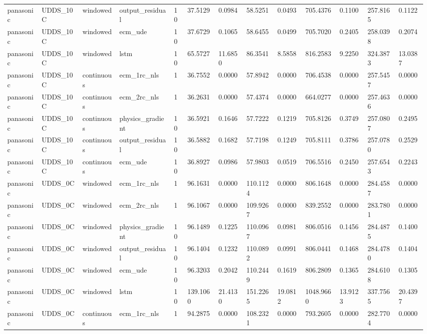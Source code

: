 \begin{tabular}{lllllllllllll}
panasonic & UDDS\_10C & windowed & output\_residual & 10 & 37.5129 & 0.0984 & 58.5251 & 0.0493 & 705.4376 & 0.1100 & 257.8165 & 0.1122 \\
panasonic & UDDS\_10C & windowed & ecm\_ude & 10 & 37.6729 & 0.1065 & 58.6455 & 0.0499 & 705.7020 & 0.2405 & 258.0398 & 0.2074 \\
panasonic & UDDS\_10C & windowed & lstm & 10 & 65.5727 & 11.6850 & 86.3541 & 8.5858 & 816.2583 & 9.2250 & 324.3873 & 13.0387 \\
panasonic & UDDS\_10C & continuous & ecm\_1rc\_nls & 1 & 36.7552 & 0.0000 & 57.8942 & 0.0000 & 706.4538 & 0.0000 & 257.5457 & 0.0000 \\
panasonic & UDDS\_10C & continuous & ecm\_2rc\_nls & 1 & 36.2631 & 0.0000 & 57.4374 & 0.0000 & 664.0277 & 0.0000 & 257.4636 & 0.0000 \\
panasonic & UDDS\_10C & continuous & physics\_gradient & 10 & 36.5921 & 0.1646 & 57.7222 & 0.1219 & 705.8126 & 0.3749 & 257.0807 & 0.2495 \\
panasonic & UDDS\_10C & continuous & output\_residual & 10 & 36.5882 & 0.1682 & 57.7198 & 0.1249 & 705.8111 & 0.3786 & 257.0780 & 0.2529 \\
panasonic & UDDS\_10C & continuous & ecm\_ude & 10 & 36.8927 & 0.0986 & 57.9803 & 0.0519 & 706.5516 & 0.2450 & 257.6543 & 0.2243 \\
panasonic & UDDS\_0C & windowed & ecm\_1rc\_nls & 1 & 96.1631 & 0.0000 & 110.1124 & 0.0000 & 806.1648 & 0.0000 & 284.4587 & 0.0000 \\
panasonic & UDDS\_0C & windowed & ecm\_2rc\_nls & 1 & 96.1067 & 0.0000 & 109.9267 & 0.0000 & 839.2552 & 0.0000 & 283.7801 & 0.0000 \\
panasonic & UDDS\_0C & windowed & physics\_gradient & 10 & 96.1489 & 0.1225 & 110.0967 & 0.0981 & 806.0516 & 0.1456 & 284.4875 & 0.1400 \\
panasonic & UDDS\_0C & windowed & output\_residual & 10 & 96.1404 & 0.1232 & 110.0892 & 0.0991 & 806.0441 & 0.1468 & 284.4780 & 0.1404 \\
panasonic & UDDS\_0C & windowed & ecm\_ude & 10 & 96.3203 & 0.2042 & 110.2449 & 0.1619 & 806.2809 & 0.1365 & 284.6108 & 0.1305 \\
panasonic & UDDS\_0C & windowed & lstm & 10 & 139.1060 & 21.4130 & 151.2265 & 19.0812 & 1048.9660 & 13.9123 & 337.7565 & 20.4397 \\
panasonic & UDDS\_0C & continuous & ecm\_1rc\_nls & 1 & 94.2875 & 0.0000 & 108.2321 & 0.0000 & 793.2605 & 0.0000 & 282.7704 & 0.0000 \\

\end{tabular}
